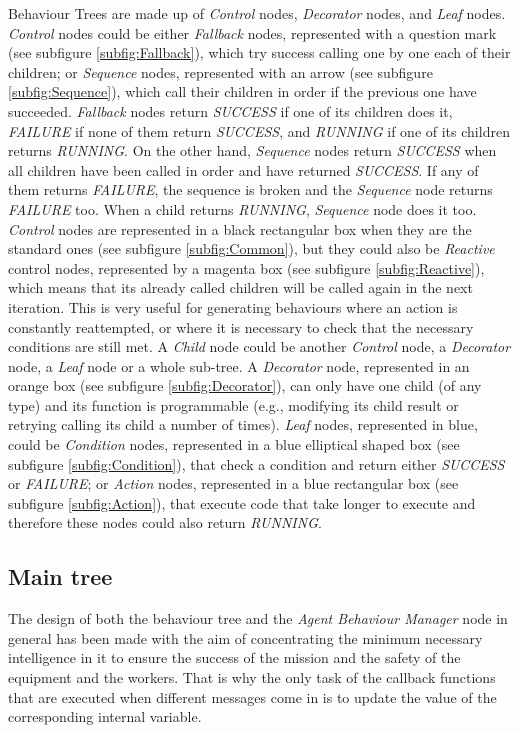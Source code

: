  Behaviour Trees are made up of \emph{Control} nodes, \emph{Decorator} nodes, and \emph{Leaf} nodes. \emph{Control} nodes could be either \emph{Fallback} nodes, represented with a question mark (see subfigure \ref{subfig:Fallback}), which try success calling one by one each of their children; or \emph{Sequence} nodes, represented with an arrow (see subfigure \ref{subfig:Sequence}), which call their children in order if the previous one have succeeded. \emph{Fallback} nodes return \emph{SUCCESS} if one of its children does it, \emph{FAILURE} if none of them return \emph{SUCCESS}, and \emph{RUNNING} if one of its children returns \emph{RUNNING}. On the other hand, \emph{Sequence} nodes return \emph{SUCCESS} when all children have been called in order and have returned \emph{SUCCESS}. If any of them returns \emph{FAILURE}, the sequence is broken and the \emph{Sequence} node returns \emph{FAILURE} too. When a child returns \emph{RUNNING}, \emph{Sequence} node does it too. \emph{Control} nodes are represented in a black rectangular box when they are the standard ones (see subfigure \ref{subfig:Common}), but they could also be \emph{Reactive} control nodes, represented by a magenta box (see subfigure \ref{subfig:Reactive}), which means that its already called children will be called again in the next iteration. This is very useful for generating behaviours where an action is constantly reattempted, or where it is necessary to check that the necessary conditions are still met. A \emph{Child} node could be another \emph{Control} node, a \emph{Decorator} node, a \emph{Leaf} node or a whole sub-tree. A \emph{Decorator} node, represented in an orange box (see subfigure \ref{subfig:Decorator}), can only have one child (of any type) and its function is programmable (e.g., modifying its child result or retrying calling its child a number of times). \emph{Leaf} nodes, represented in blue, could be \emph{Condition} nodes, represented in a blue elliptical shaped box (see subfigure \ref{subfig:Condition}), that check a condition and return either \emph{SUCCESS} or \emph{FAILURE}; or \emph{Action} nodes, represented in a blue rectangular box (see subfigure \ref{subfig:Action}), that execute code that take longer to execute and therefore these nodes could also return \emph{RUNNING}.

\subsection{Main tree}
\label{sec:MainTree}
The design of both the behaviour tree and the \emph{Agent Behaviour Manager} node in general has been made with the aim of concentrating the minimum necessary intelligence in it to ensure the success of the mission and the safety of the equipment and the workers. That is why the only task of the callback functions that are executed when different messages come in is to update the value of the corresponding internal variable. 

